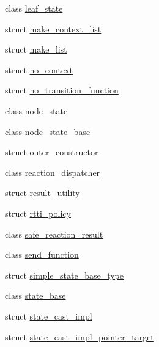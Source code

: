 \begin{DoxyCompactItemize}
\item 
class \mbox{\hyperlink{classboost_1_1statechart_1_1detail_1_1leaf__state}{leaf\+\_\+state}}
\item 
struct \mbox{\hyperlink{structboost_1_1statechart_1_1detail_1_1make__context__list}{make\+\_\+context\+\_\+list}}
\item 
struct \mbox{\hyperlink{structboost_1_1statechart_1_1detail_1_1make__list}{make\+\_\+list}}
\item 
struct \mbox{\hyperlink{structboost_1_1statechart_1_1detail_1_1no__context}{no\+\_\+context}}
\item 
struct \mbox{\hyperlink{structboost_1_1statechart_1_1detail_1_1no__transition__function}{no\+\_\+transition\+\_\+function}}
\item 
class \mbox{\hyperlink{classboost_1_1statechart_1_1detail_1_1node__state}{node\+\_\+state}}
\item 
class \mbox{\hyperlink{classboost_1_1statechart_1_1detail_1_1node__state__base}{node\+\_\+state\+\_\+base}}
\item 
struct \mbox{\hyperlink{structboost_1_1statechart_1_1detail_1_1outer__constructor}{outer\+\_\+constructor}}
\item 
class \mbox{\hyperlink{classboost_1_1statechart_1_1detail_1_1reaction__dispatcher}{reaction\+\_\+dispatcher}}
\item 
struct \mbox{\hyperlink{structboost_1_1statechart_1_1detail_1_1result__utility}{result\+\_\+utility}}
\item 
struct \mbox{\hyperlink{structboost_1_1statechart_1_1detail_1_1rtti__policy}{rtti\+\_\+policy}}
\item 
class \mbox{\hyperlink{classboost_1_1statechart_1_1detail_1_1safe__reaction__result}{safe\+\_\+reaction\+\_\+result}}
\item 
class \mbox{\hyperlink{classboost_1_1statechart_1_1detail_1_1send__function}{send\+\_\+function}}
\item 
struct \mbox{\hyperlink{structboost_1_1statechart_1_1detail_1_1simple__state__base__type}{simple\+\_\+state\+\_\+base\+\_\+type}}
\item 
class \mbox{\hyperlink{classboost_1_1statechart_1_1detail_1_1state__base}{state\+\_\+base}}
\item 
struct \mbox{\hyperlink{structboost_1_1statechart_1_1detail_1_1state__cast__impl}{state\+\_\+cast\+\_\+impl}}
\item 
struct \mbox{\hyperlink{structboost_1_1statechart_1_1detail_1_1state__cast__impl__pointer__target}{state\+\_\+cast\+\_\+impl\+\_\+pointer\+\_\+target}}

\end{DoxyCompactItemize}
